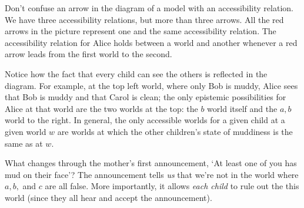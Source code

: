 Don't confuse an arrow in the diagram of a model with an accessibility relation.
We have three accessibility relations, but more than three arrows. All the red
arrows in the picture represent one and the same accessibility relation. The
accessibility relation for Alice holds between a world and another whenever a
red arrow leads from the first world to the second.

Notice how the fact that every child can see the others is reflected in the
diagram. For example, at the top left world, where only Bob is muddy, Alice sees that Bob
is muddy and that Carol is clean; the only epistemic possibilities for Alice at
that world are the two worlds at the top: the $b$ world itself and the $a,b$ world to the right. In
general, the only accessible worlds for a given child at a given world $w$ are
worlds at which the other children's state of muddiness is the same as at $w$.

What changes through the mother's first announcement, `At least one of you has
mud on their face'? The announcement tells \emph{us} that we're not in the
world where $a,b,$ and $c$ are all false. More importantly, it allows \emph{each child} to rule out the this world (since they all hear and accept the announcement).

\begin{center}
\end{center}

